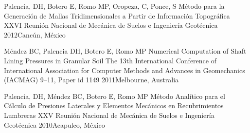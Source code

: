 {Palencia, DH, Botero E, Romo MP, Oropeza, C, Ponce, S}
{Método para la Generación de Mallas Tridimensionales a Partir de
Información Topográfica}
{XXVI Reunión Nacional de Mecánica de Suelos e Ingeniería Geotécnica}
{2012}{Cancún, México}

{Méndez BC, Palencia DH, Botero E, Romo MP}
{Numerical Computation of Shaft Lining Pressures in Granular Soil}
{The 13th International Conference of International Association for
Computer Methods and Advances in Geomechanics (IACMAG) 9--11, Paper id 1149}
{2011}{Melbourne, Australia}

{Palencia, DH, Méndez BC, Botero E, Romo MP}
{Método Analítico para el Cálculo de Presiones Laterales y
Elementos Mecánicos en Recubrimientos Lumbreras}
{XXV Reunión Nacional de Mecánica de Suelos e Ingeniería Geotécnica}
{2010}{Acapulco, México}
